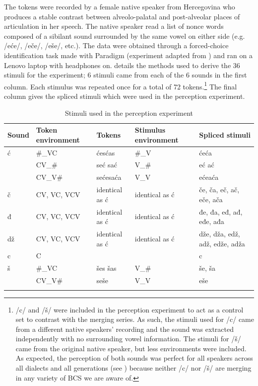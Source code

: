 \documentclass[output=paper,
modfonts,
newtxmath,
hidelinks,
]{langscibook}
\begin{document}
The tokens were recorded by a female native speaker from Hercegovina who produces a stable contrast between alveolo-palatal and post-alveolar places of articulation in her speech. The native speaker read a list of nonce words composed of a sibilant sound surrounded by the same vowel on either side (e.g. /eće/, /eče/, /eše/, etc.). The data were obtained through a forced-choice identification task made with Paradigm (experiment adapted from \citealt{Lee-Jongman2016}) and ran on a Lenovo laptop with headphones on.  details the methods used to derive the 36 stimuli for the experiment; 6 stimuli came from each of the 6 sounds in the first column. Each stimulus was repeated once for a total of 72 tokens.\footnote{/c/ and /š/ were included in the perception experiment to act as a control set to contrast with the merging series. As such, the stimuli used for /c/ came from a different native speakers' recording and the sound was extracted independently with no surrounding vowel information. The stimuli for /š/ came from the original native speaker, but less environments were included. As expected, the perception of both sounds was perfect for all speakers across all dialects and all generations (see ) because neither /c/ nor /š/ are merging in any variety of BCS we are aware of.} The final column gives the spliced stimuli which were used in the perception experiment.

\begin{table}
\begin{tabularx}{\textwidth}{llXQQ}
\lsptoprule
 \textbf{Sound} &  \textbf{Token environment} &  \textbf{Tokens} &  \textbf{Stimulus environment} &  \textbf{Spliced stimuli}\\
\midrule
{ć} & \#\_VC & {ćes}\newline ćas & \#\_V & {će}\newline ća\\
& CV\_\# & {seć} \newline sać & V\_\# & {eć} \newline  ać\\

\tablevspace 
& CV\_V\# & {seće}\newline saća & V\_V & {eće}\newline aća\\

\tablevspace
č & CV, VC, VCV & identical as ć & identical as ć & če, ča, eč, ač, eče, ača\\
{đ} & CV, VC, VCV & identical as ć & identical as ć & đe, đa, eđ, ađ, eđe, ađa\\
dž & CV, VC, VCV & identical as ć & identical as ć & dže, dža, edž, adž, edže, adža\\
c & C &  &  & c\\
{š} & \#\_VC & {šes} \newline šas & V\_\# & še, ša\\
& CV\_V\# & seše & V\_V & eše\\
\lspbottomrule
\end{tabularx}
\caption{\label{tab:mihajlovic:3} Stimuli used in the perception experiment}
\end{table}
\end{document}
